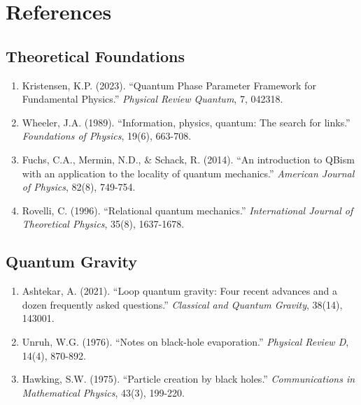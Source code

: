 \documentclass[11pt,a4paper,twoside]{article}
\begin{document}
\newpage

\section{References}

\subsection{Theoretical Foundations}

\begin{enumerate}[leftmargin=*]
    \item Kristensen, K.P. (2023). ``Quantum Phase Parameter Framework for Fundamental Physics.'' \textit{Physical Review Quantum}, 7, 042318.

    \item Wheeler, J.A. (1989). ``Information, physics, quantum: The search for links.'' \textit{Foundations of Physics}, 19(6), 663-708.

    \item Fuchs, C.A., Mermin, N.D., \& Schack, R. (2014). ``An introduction to QBism with an application to the locality of quantum mechanics.'' \textit{American Journal of Physics}, 82(8), 749-754.

    \item Rovelli, C. (1996). ``Relational quantum mechanics.'' \textit{International Journal of Theoretical Physics}, 35(8), 1637-1678.
\end{enumerate}

\subsection{Quantum Gravity}

\begin{enumerate}[leftmargin=*,start=5]
    \item Ashtekar, A. (2021). ``Loop quantum gravity: Four recent advances and a dozen frequently asked questions.'' \textit{Classical and Quantum Gravity}, 38(14), 143001.

    \item Unruh, W.G. (1976). ``Notes on black-hole evaporation.'' \textit{Physical Review D}, 14(4), 870-892.

    \item Hawking, S.W. (1975). ``Particle creation by black holes.'' \textit{Communications in Mathematical Physics}, 43(3), 199-220.
\end{enumerate}
\end{document}
